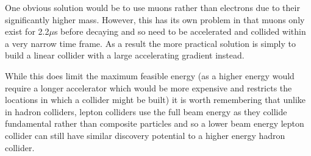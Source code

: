 One obvious solution would be to use muons rather than electrons due to their significantly higher mass. However, this has its own problem in that muons only exist for 2.2${\mu}$s before decaying and so need to be accelerated and collided within a very narrow time frame. As a result the more practical solution is simply to build a linear collider with a large accelerating gradient instead.

While this does limit the maximum feasible energy (as a higher energy would require a longer accelerator which would be more expensive and restricts the locations in which a collider might be built) it is worth remembering that unlike in hadron colliders, lepton colliders use the full beam energy as they collide fundamental rather than composite particles and so a lower beam energy lepton collider can still have similar discovery potential to a higher energy hadron collider.

